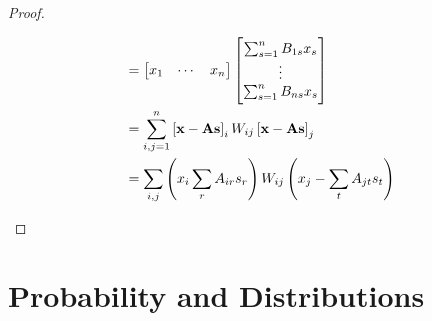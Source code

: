 \documentclass[12pt,openany]{book}
\theoremstyle{definition}
\newcommand{\of}[1]{\left( #1 \right)}
\renewcommand{\vec}[1]{\textbf{#1}}
\begin{document}
\begin{proof}
\begin{enumerate}[(1)]
\begin{align*}
			&=\begin{bmatrix}
				x_1 & \cdots & x_n
			\end{bmatrix}\begin{bmatrix}
				\sum_{s=1}^nB_{1s}x_s \\ \vdots \\ \sum_{s=1}^nB_{ns}x_s
			\end{bmatrix}\\
			&=\sum_{i,j=1}^n\sbr{\vec{x}-\vec{A}\vec{s}}_iW_{ij}\sbr{\vec{x}-\vec{A}\vec{s}}_j\\
			&=\sum_{i,j}\of{x_i\sum_{r}A_{ir}s_r}W_{ij}\of{x_j-\sum_{t}A_{jt}s_t}
		\end{align*}
	\end{enumerate}
\end{proof}

	\newpage
	\chapter{Probability and Distributions}
	
\end{document}
